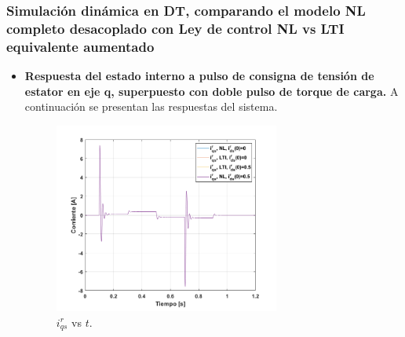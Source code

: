 \documentclass[10pt]{article}
\begin{document}
\subsubsection{Simulación dinámica en DT, comparando el modelo NL completo desacoplado con Ley de control
NL vs LTI equivalente aumentado}
\begin{itemize}

\item \textbf{Respuesta del estado interno a pulso de consigna de tensión de estator en eje q, superpuesto con doble pulso de torque de carga.}
A continuación se presentan las respuestas del sistema.
	\begin{figure}[h!]
	\centering
	\includegraphics[width=0.7\textwidth]{iq_LTIvsNL.png}
	\caption{\label{fig:iq_LTIvsNL} $i^{r}_{qs}$ vs $t$.}
	\end{figure}
	

\end{itemize}
\end{document}
